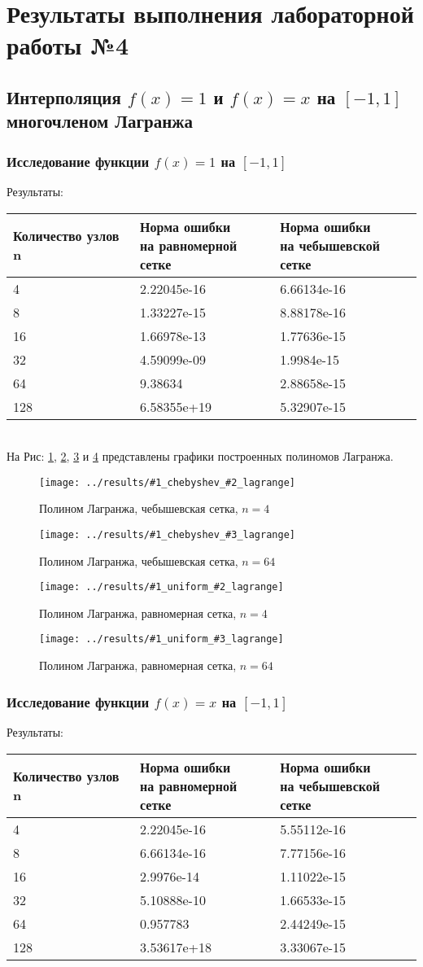 \documentclass[12pt]{article}
\date{}
\author{}
\newcommand{\lagrange}[3] {
	На Рис: \ref{fig:#1chebyshev#2lagrange},  \ref{fig:#1chebyshev#3lagrange}, \ref{fig:#1uniform#2lagrange} и \ref{fig:#1uniform#3lagrange}
	представлены графики построенных полиномов Лагранжа.
	
	\begin{figure}[H]
		\centering
		\texttt{[image: ../results/\#1\_chebyshev\_\#2\_lagrange]}
		\caption{Полином Лагранжа, чебышевская сетка, $n = #2$}
		\label{fig:#1chebyshev#2lagrange}
	\end{figure}
	\begin{figure}[H]
		\centering
		\texttt{[image: ../results/\#1\_chebyshev\_\#3\_lagrange]}
		\caption{Полином Лагранжа, чебышевская сетка, $n = #3$}
		\label{fig:#1chebyshev#3lagrange}
	\end{figure}
	\begin{figure}[H]
		\centering
		\texttt{[image: ../results/\#1\_uniform\_\#2\_lagrange]}
		\caption{Полином Лагранжа, равномерная сетка, $n = #2$}
		\label{fig:#1uniform#2lagrange}
	\end{figure}
	\begin{figure}[H]
		\centering
		\texttt{[image: ../results/\#1\_uniform\_\#3\_lagrange]}
		\caption{Полином Лагранжа, равномерная сетка, $n = #3$}
		\label{fig:#1uniform#3lagrange}
	\end{figure}
}
\begin{document}
\section{Результаты выполнения лабораторной работы №4}
\subsection{Интерполяция $f(x) = 1$ и $f(x) = x$ на $[-1, 1]$ многочленом Лагранжа}

\subsubsection{Исследование функции $f(x) = 1$ на $[-1, 1]$}
Результаты:\\
\begin{tabular}{|l|l|l|}
\hline Количество узлов n & \pbox{20cm}{Норма ошибки\\ на равномерной сетке} & \pbox{20cm}{Норма ошибки\\ на чебышевской сетке} \\ \hline
4 & 2.22045e-16 & 6.66134e-16 \\ \hline
8 & 1.33227e-15 & 8.88178e-16 \\ \hline
16 & 1.66978e-13 & 1.77636e-15 \\ \hline
32 & 4.59099e-09 & 1.9984e-15 \\ \hline
64 & 9.38634 & 2.88658e-15 \\ \hline
128 & 6.58355e+19 & 5.32907e-15 \\ \hline
\end{tabular}\\
\lagrange{const}{4}{64}

\subsubsection{Исследование функции $f(x) = x$ на $[-1, 1]$}
Результаты:\\
\begin{tabular}{|l|l|l|}
\hline Количество узлов n & \pbox{20cm}{Норма ошибки\\ на равномерной сетке} & \pbox{20cm}{Норма ошибки\\ на чебышевской сетке} \\ \hline
4 & 2.22045e-16 & 5.55112e-16 \\ \hline
8 & 6.66134e-16 & 7.77156e-16 \\ \hline
16 & 2.9976e-14 & 1.11022e-15 \\ \hline
32 & 5.10888e-10 & 1.66533e-15 \\ \hline
64 & 0.957783 & 2.44249e-15 \\ \hline
128 & 3.53617e+18 & 3.33067e-15 \\ \hline
\end{tabular}\\
\end{document}
